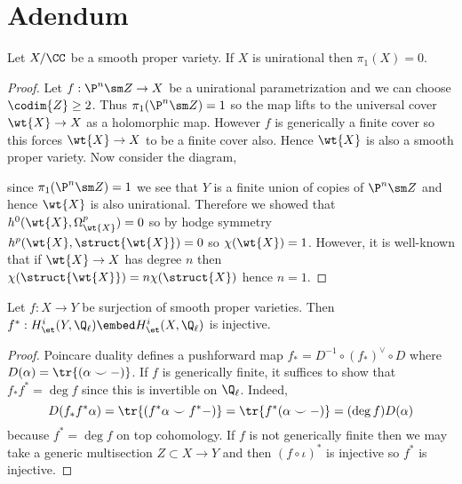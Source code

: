 \documentclass[12pt]{article}
\begin{document}
\section{Adendum}

\begin{prop}
Let $X / \CC$ be a smooth proper variety. If $X$ is unirational then $\pi_1(X) = 0$.
\end{prop} 


\begin{proof}
Let $f : \P^n \sm Z \to X$ be a unirational parametrization and we can choose $\codim{Z} \ge 2$. Thus $\pi_1(\P^n \sm Z) = 1$ so the map lifts to the universal cover $\wt{X} \to X$ as a holomorphic map. However $f$ is generically a finite cover so this forces $\wt{X} \to X$ to be a finite cover also. Hence $\wt{X}$ is also a smooth proper variety. Now consider the diagram,
\begin{center}
\end{center}
since $\pi_1(\P^n \sm Z) = 1$ we see that $Y$ is a finite union of copies of $\P^n \sm Z$ and hence $\wt{X}$ is also unirational. Therefore we showed that $h^0(\wt{X}, \Omega_{\wt{X}}^p) = 0$ so by hodge symmetry $h^p(\wt{X}, \struct{\wt{X}}) = 0$ so $\chi(\wt{X}) = 1$. However, it is well-known that if $\wt{X} \to X$ has degree $n$ then $\chi(\struct{\wt{X}}) = n \chi(\struct{X})$ hence $n = 1$. 
\end{proof}


\begin{lemma}
Let $f : X \to Y$ be surjection of smooth proper varieties. Then $f^* : H^i_{\et}(Y, \Q_\ell) \embed H^i_{\et}(X, \Q_\ell)$ is injective.
\end{lemma}

\begin{proof}
Poincare duality defines a pushforward map $f_* = D^{-1} \circ (f_*)^{\vee} \circ D$ where $D(\alpha) = \tr{(\alpha \smile -)}$. If $f$ is generically finite, it suffices to show that $f_* f^* = \deg{f}$ since this is invertible on $\Q_\ell$. Indeed, 
\[ D(f_* f^* \alpha) = \tr{(f^* \alpha \smile f^* - )} = \tr{f^* (\alpha \smile -)} = (\deg{f}) D(\alpha) \]
because $f^* = \deg{f}$ on top cohomology. If $f$ is not generically finite then we may take a generic multisection $Z \subset X \to Y$ and then $(f \circ \iota)^*$ is injective so $f^*$ is injective.
\end{proof}
\end{document}

